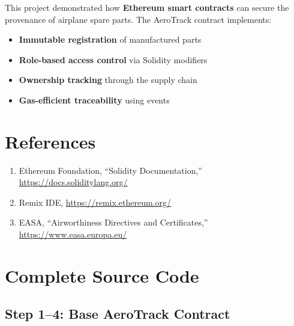 \documentclass[12pt,a4paper]{article}
\begin{document}
This project demonstrated how \textbf{Ethereum smart contracts} can secure the provenance of airplane spare parts. The AeroTrack contract implements:

\begin{itemize}
    \item \textbf{Immutable registration} of manufactured parts
    \item \textbf{Role-based access control} via Solidity modifiers
    \item \textbf{Ownership tracking} through the supply chain
    \item \textbf{Gas-efficient traceability} using events
\end{itemize}

\section*{References}

\begin{enumerate}
    \item Ethereum Foundation, ``Solidity Documentation,'' \url{https://docs.soliditylang.org/}
    \item Remix IDE, \url{https://remix.ethereum.org/}
    \item EASA, ``Airworthiness Directives and Certificates,'' \url{https://www.easa.europa.eu/}
\end{enumerate}

\newpage
\appendix
\section{Complete Source Code}

\subsection{Step 1--4: Base AeroTrack Contract}
\end{document}

